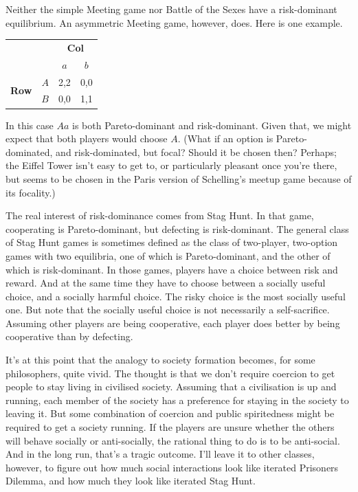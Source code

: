\documentclass[openany]{book}
\begin{document}
Neither the simple Meeting game nor Battle of the Sexes have a risk-dominant equilibrium. An asymmetric Meeting game, however, does. Here is one example.

\begin{center}
\begin{tabular}{l r | c c}
& & \multicolumn{2}{c}{\textbf{Col}} \\
& & $a$ & $b$  \\ \hline
\multirow{2}{*}{\textbf{Row}}
& $A$ & 2,2 & 0,0 \\
& $B$ & 0,0 & 1,1
\end{tabular}
\end{center}

In this case $Aa$ is both Pareto-dominant and risk-dominant. Given that, we might expect that both players would choose $A$. (What if an option is Pareto-dominated, and risk-dominated, but focal? Should it be chosen then? Perhaps; the Eiffel Tower isn't easy to get to, or particularly pleasant once you're there, but seems to be chosen in the Paris version of Schelling's meetup game because of its focality.)

The real interest of risk-dominance comes from  Stag Hunt. In that game, cooperating is Pareto-dominant, but defecting is risk-dominant. The general class of Stag Hunt games is sometimes defined as the class of two-player, two-option games with two equilibria, one of which is Pareto-dominant, and the other of which is risk-dominant. In those games, players have a choice between risk and reward. And at the same time they have to choose between a socially useful choice, and a socially harmful choice. The risky choice is the most socially useful one. But note that the socially useful choice is not necessarily a self-sacrifice. Assuming other players are being cooperative, each player does better by being cooperative than by defecting.

It's at this point that the analogy to society formation becomes, for some philosophers, quite vivid. The thought is that we don't require coercion to get people to stay living in civilised society. Assuming that a civilisation is up and running, each member of the society has a preference for staying in the society to leaving it. But some combination of coercion and public spiritedness might be required to get a society running. If the players are unsure whether the others will behave socially or anti-socially, the rational thing to do is to be anti-social. And in the long run, that's a tragic outcome. I'll leave it to other classes, however, to figure out how much social interactions look like iterated Prisoners Dilemma, and how much they look like iterated Stag Hunt.
\end{document}
